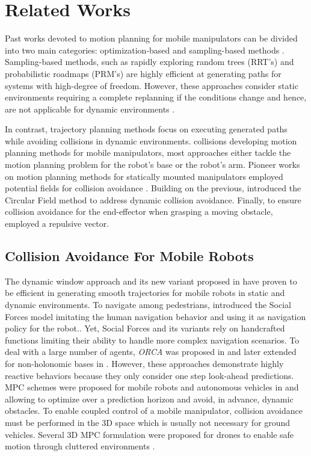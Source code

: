 \section{Related Works}%
\label{sec:related_works}

Past works devoted to motion planning for mobile manipulators can be divided
into two main categories: optimization-based and sampling-based methods
\cite{LaValle2006,Mukadam2017}. Sampling-based methods, such as rapidly
exploring random trees (RRT's) \cite{Webb2013,Kleinbort2019,Kuffner2000} and
probabilistic roadmaps (PRM's) \cite{Hsu2002,Faust2017} are highly efficient at
generating paths for systems with high-degree of freedom. However, these
approaches consider static environments requiring a complete replanning if the
conditions change and hence, are not applicable for dynamic environments
\cite{Avanzini2018}.

In contrast, trajectory planning methods focus on executing generated paths
while avoiding collisions in dynamic environments. collisions developing motion
planning methods for mobile manipulators, most approaches either tackle the
motion planning problem for the robot's base or the robot's arm. Pioneer works
on motion planning methods for statically mounted manipulators employed
potential fields for collision avoidance \cite{Khatib1985}. Building on the
previous, \cite{Haddadin2011} introduced the Circular Field method to address
dynamic collision avoidance. Finally, to ensure collision avoidance for the
end-effector when grasping a moving obstacle, \cite{Du2018} employed a
repulsive vector.

\subsection{Collision Avoidance For Mobile Robots}
The dynamic window approach \cite{Fox1997} and its new variant proposed in
\cite{Zhang2019} have proven to be efficient in generating smooth trajectories
for mobile robots in static and dynamic environments. To navigate among
pedestrians, \cite{Ferrer2013} introduced the Social Forces model imitating
the human navigation behavior and using it as navigation policy for the
robot..  Yet, Social Forces and its variants rely on handcrafted functions
limiting their ability to handle more complex navigation scenarios. To deal
with a large number of agents, \textit{ORCA} was proposed in
\cite{VanDenBerg2011} and later extended for non\hyp{}holonomic bases in
\cite{Alonso-Mora2012a}. However, these approaches demonstrate highly reactive
behaviors because they only consider one step look-ahead predictions. MPC
schemes were proposed for mobile robots and autonomous vehicles in
\cite{Brito2019} and \cite{Schwarting2018} allowing to optimize over a
prediction horizon and avoid, in advance, dynamic obstacles. To enable coupled
control of a mobile manipulator, collision avoidance must be performed in the
3D space which is usually not necessary for ground vehicles. Several 3D MPC
formulation were proposed for drones to enable safe motion through cluttered
environments \cite{Tordesillas2019,Liu2017}.

